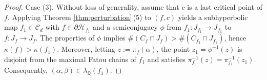 \documentclass[a4paper,reqno,times, 11pt]{amsart}
\theoremstyle{remark}
\theoremstyle{plain}
\numberwithin{equation}{section}
\def\HHHH{\mathscr H}
\def\CCCC{\mathscr C}
\def\Q{\mathbb Q}
\begin{document}
\begin{proof}
	Case (3). Without loss of generality, assume that $c$ is a last critical point of $f$. Applying Theorem \ref{thm:perturbation}\,(5) to $(f,c)$ yields a subhyperbolic map $f_1\in\CCCC_d$ with $f\in\partial\HHHH_{f_1}$ and a semiconjugacy $\phi$ from $f_1:J_{f_1}\to J_{f_1}$ to $f:J_f\to J_f$. The properties of $\phi$ implies $\#(C_f\cap J_f)>\#(C_{f_1}\cap J_{f_1})$, hence $\kappa(f)>\kappa(f_1)$. Moreover, letting $z:=\pi_f(\alpha)$, the point $z_1=\phi^{-1}(z)$ is disjoint from the maximal Fatou chains of $f_1$ and satisfies $\pi_f^{-1}(z)=\pi_{f_1}^{-1}(z_1)$. Consequently, $(\alpha,\beta)\in\lambda_\Q(f_1)$.	
%
%
\end{proof}
\end{document}
